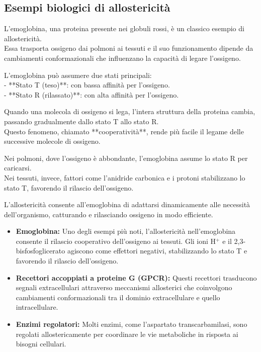 \documentclass[Lau,binding=0.6cm,oneside,noexaminfo]{sapthesis}
\begin{document}
\subsection*{Esempi biologici di allostericità}
L’emoglobina, una proteina presente nei globuli rossi, è un classico esempio di allostericità. \\
Essa trasporta ossigeno dai polmoni ai tessuti e il suo funzionamento dipende da cambiamenti conformazionali che influenzano la capacità di legare l’ossigeno.

L’emoglobina può assumere due stati principali: \\
- **Stato T (teso)**: con bassa affinità per l’ossigeno. \\
- **Stato R (rilassato)**: con alta affinità per l’ossigeno.

Quando una molecola di ossigeno si lega, l’intera struttura della proteina cambia, passando gradualmente dallo stato T allo stato R. \\
Questo fenomeno, chiamato **cooperatività**, rende più facile il legame delle successive molecole di ossigeno.

Nei polmoni, dove l’ossigeno è abbondante, l’emoglobina assume lo stato R per caricarsi. \\
Nei tessuti, invece, fattori come l’anidride carbonica e i protoni stabilizzano lo stato T, favorendo il rilascio dell’ossigeno.

L’allostericità consente all’emoglobina di adattarsi dinamicamente alle necessità dell’organismo, catturando e rilasciando ossigeno in modo efficiente.
\begin{itemize}
    \item \textbf{Emoglobina:} Uno degli esempi più noti, l’allostericità nell’emoglobina consente il rilascio cooperativo dell’ossigeno ai tessuti. Gli ioni H\(^+\) e il 2,3-bisfosfoglicerato agiscono come effettori negativi, stabilizzando lo stato T e favorendo il rilascio dell’ossigeno.
    \item \textbf{Recettori accoppiati a proteine G (GPCR):} Questi recettori trasducono segnali extracellulari attraverso meccanismi allosterici che coinvolgono cambiamenti conformazionali tra il dominio extracellulare e quello intracellulare.
    \item \textbf{Enzimi regolatori:} Molti enzimi, come l’aspartato transcarbamilasi, sono regolati allostericamente per coordinare le vie metaboliche in risposta ai bisogni cellulari.
\end{itemize}
\end{document}
